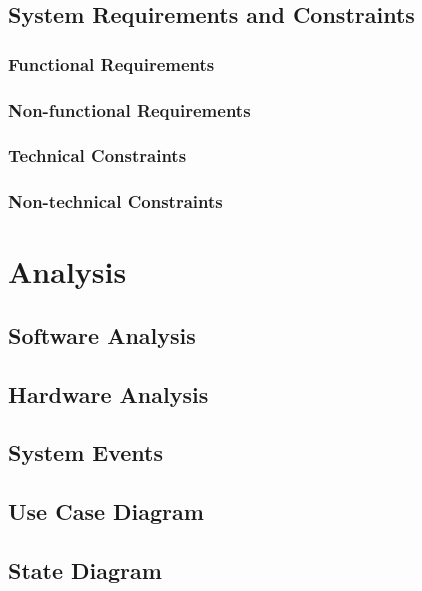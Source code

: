 \documentclass[11pt]{article}
\begin{document}
    \subsection{System Requirements and Constraints}
    
    \subsubsection{Functional Requirements}
    
    \subsubsection{Non-functional Requirements}
    
    \subsubsection{Technical Constraints}
    
    \subsubsection{Non-technical Constraints}
    
    \newpage
    \section{Analysis}
    
    \subsection{Software Analysis}
    
    \subsection{Hardware Analysis}
    
    \subsection{System Events}
    
    \subsection{Use Case Diagram}
    
    \subsection{State Diagram}
    
\end{document}
